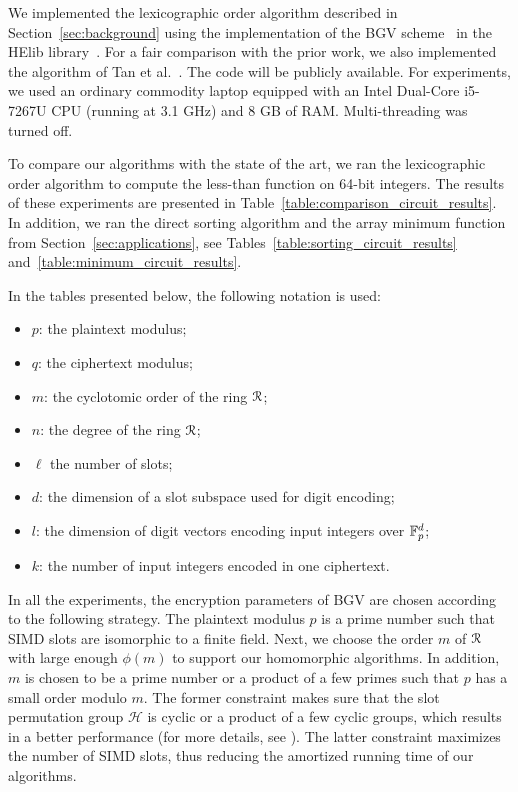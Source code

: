 We implemented the lexicographic order algorithm described in Section~\ref{sec:background} using the implementation of the BGV scheme~\cite{BGV12} in the HElib library~\cite{HElib}.
For a fair comparison with the prior work, we also implemented the algorithm of Tan et al.~\cite{TLWRK20}.
The code will be publicly available.
For experiments, we used an ordinary commodity laptop equipped with an Intel Dual-Core i5-7267U CPU (running at 3.1 GHz) and 8 GB of RAM.
Multi-threading was turned off.

To compare our algorithms with the state of the art, we ran the lexicographic order algorithm to compute the less-than function on 64-bit integers.
The results of these experiments are presented in Table~\ref{table:comparison_circuit_results}.
In addition, we ran the direct sorting algorithm and the array minimum function from Section~\ref{sec:applications}, see Tables~\ref{table:sorting_circuit_results} and~\ref{table:minimum_circuit_results}.

In the tables presented below, the following notation is used:
\begin{itemize}
  \item $p$: the plaintext modulus;
  \item $q$: the ciphertext modulus;
  \item $m$: the cyclotomic order of the ring $\mathcal{R}$;
  \item $n$: the degree of the ring $\mathcal{R}$;
  \item $\ell$ the number of slots;
  \item $d$: the dimension of a slot subspace used for digit encoding;
  \item $l$: the dimension of digit vectors encoding input integers over $\mathbb{F}_p^d$;
  \item $k$: the number of input integers encoded in one ciphertext.
\end{itemize}

In all the experiments, the encryption parameters of BGV are chosen according to the following strategy.
The plaintext modulus $p$ is a prime number such that SIMD slots are isomorphic to a finite field.
Next, we choose the order $m$ of $\mathcal{R}$ with large enough $\phi(m)$ to support our homomorphic algorithms.
In addition, $m$ is chosen to be a prime number or a product of a few primes such that $p$ has a small order modulo $m$.
The former constraint makes sure that the slot permutation group $\mathcal{H}$ is cyclic or a product of a few cyclic groups, which results in a better performance (for more details, see \cite[Appendix C.3]{GHS12}).
The latter constraint maximizes the number of SIMD slots, thus reducing the amortized running time of our algorithms.

